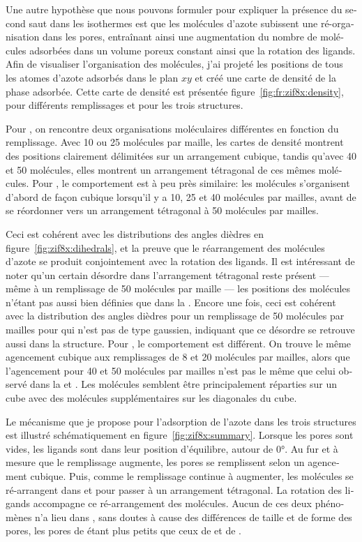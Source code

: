 \documentclass[thesis]{subfiles}
\begin{document}
\begin{otherlanguage}{french}
Une autre hypothèse que nous pouvons formuler pour expliquer la présence du
second saut dans les isothermes est que les molécules d'azote subissent une
ré-organisation dans les pores, entraînant ainsi une augmentation du nombre de
molécules adsorbées dans un volume poreux constant ainsi que la rotation des
ligands. Afin de visualiser l'organisation des molécules, j'ai projeté les
positions de tous les atomes d'azote adsorbés dans le plan $xy$ et créé une
carte de densité de la phase adsorbée. Cette carte de densité est présentée
figure~\ref{fig:fr:zif8x:density}, pour différents remplissages et pour les trois
structures.

Pour , on rencontre deux organisations moléculaires différentes en
fonction du remplissage. Avec 10 ou 25 molécules par maille, les cartes de
densité montrent des positions clairement délimitées sur un arrangement cubique,
tandis qu'avec 40 et 50 molécules, elles montrent un arrangement tétragonal de
ces mêmes molécules. Pour \ZIFCl, le comportement est à peu près similaire: les
molécules s'organisent d'abord de façon cubique lorsqu'il y a 10, 25 et 40
molécules par mailles, avant de se réordonner vers un arrangement tétragonal à
50 molécules par mailles.

Ceci est cohérent avec les distributions des angles dièdres en
figure~\ref{fig:zif8x:dihedrals}, et la preuve que le réarrangement des
molécules d'azote se produit conjointement avec la rotation des ligands. Il est
intéressant de noter qu'un certain désordre dans l'arrangement tétragonal reste
présent --- même à un remplissage de 50 molécules par maille --- les positions
des molécules n'étant pas aussi bien définies que dans la . Encore une
fois, ceci est cohérent avec la distribution des angles dièdres pour un
remplissage de 50 molécules par mailles pour \ZIFCl qui n'est pas de type
gaussien, indiquant que ce désordre se retrouve aussi dans la structure. Pour
\ZIFBr, le comportement est différent. On trouve le même agencement cubique aux
remplissages de 8 et 20 molécules par mailles, alors que l'agencement pour 40 et
50 molécules par mailles n'est pas le même que celui observé dans la  et
\ZIFCl. Les molécules semblent être principalement réparties sur un cube avec
des molécules supplémentaires sur les diagonales du cube.

Le mécanisme que je propose pour l'adsorption de l'azote dans les trois
structures  est illustré schématiquement en figure~\ref{fig:zif8x:summary}.
Lorsque les pores sont vides, les ligands sont dans leur position d'équilibre,
autour de 0°. Au fur et à mesure que le remplissage augmente, les pores se
remplissent selon un agencement cubique. Puis, comme le remplissage continue à
augmenter, les molécules se ré-arrangent dans  et \ZIFCl pour passer à un
arrangement tétragonal. La rotation des ligands accompagne ce ré-arrangement des
molécules. Aucun de ces deux phénomènes n'a lieu dans \ZIFBr, sans doutes à cause
des différences de taille et de forme des pores, les pores de \ZIFBr étant
plus petits que ceux de \ZIFCl et de .


\end{otherlanguage}
\end{document}
